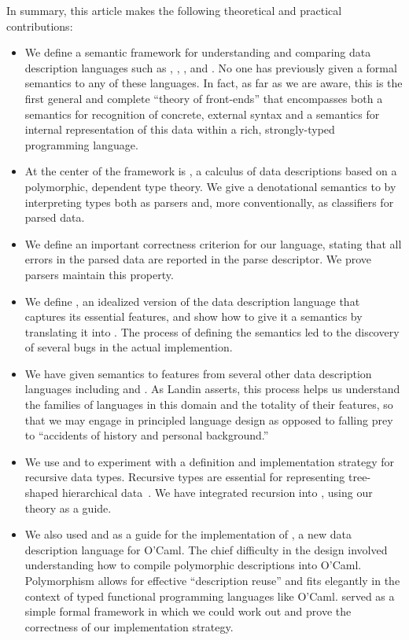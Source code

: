 In summary, this article makes the following theoretical and practical
contributions:
%
\begin{itemize}
\item We define a semantic framework for understanding and comparing 
data description languages such as \padsc{}, \padsml{},
\packettypes{}, and \datascript{}.
No one has previously given a formal semantics to any of these 
languages.  In fact, as far as we are aware, this is the first
general and complete ``theory of front-ends'' that encompasses 
both a semantics for recognition of concrete, external syntax and 
a semantics for internal representation of this data within a
rich, strongly-typed programming language.

\item At the center of the framework is \ddc{},
a calculus of data descriptions based on a polymorphic, dependent type theory.
We give a denotational semantics
to \ddc{} by interpreting
types both as parsers and, more conventionally, 
as classifiers for parsed data. 

\item We define an important correctness criterion for our language,
stating that all errors in the parsed data are reported in the parse 
descriptor.  We prove \ddc{} parsers maintain this property.

\item We define \ipads{}, an idealized
version of the \padsc{} data description language
that captures its essential features,
and show how to give it a semantics by translating it into \ddc{}.  
The process of defining the semantics led to the
discovery of several bugs in the actual implemention.

\item We have given semantics to features from several other data description
languages including \packettypes{} and \datascript{}.  As Landin asserts, 
this process helps us understand the families of languages in this domain
and the totality of their features, so that we may engage in principled
language design
as opposed to falling prey to ``accidents of history and personal background.''

\item We use \ipads{} and \ddc{} to experiment with 
a definition and implementation strategy for recursive data types.  
Recursive types are essential for representing 
tree-shaped hierarchical
data~\cite{geneontology,newick-data}.  
We have integrated recursion into \padsc{},
using our theory as a guide. 

\item We also used \ipads{} and \ddc{} as a guide for the 
implementation of \padsml{},
a new data description language for O'Caml.  The chief difficulty
in the design involved understanding how to compile
polymorphic descriptions into O'Caml.  Polymorphism allows for effective
``description reuse'' and fits elegantly in the context of
typed functional programming languages like O'Caml.  \ddc{} served as
a simple formal framework in which we could work out and prove the
correctness of our implementation strategy.
\end{itemize}

